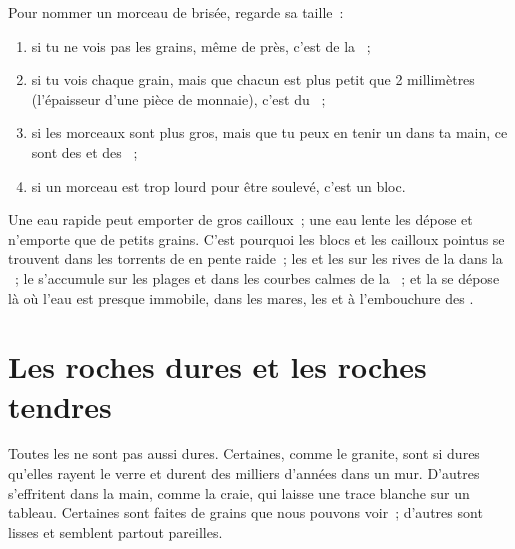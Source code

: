 \begin{method}\label{met:g3:stones-pebbles-sand:sort}
Pour nommer un morceau de  brisée, regarde sa taille~:
\begin{enumerate}
  \item si tu ne vois pas les grains, même de près, c'est de la ~;
  \item si tu vois chaque grain, mais que chacun est plus petit que
        2 millimètres (l'épaisseur d'une pièce de monnaie), c'est du ~;
  \item si les morceaux sont plus gros, mais que tu peux en tenir un dans
        ta main, ce sont des  et des ~;
  \item si un morceau est trop lourd pour être soulevé, c'est un bloc.
\end{enumerate}
\end{method}

\begin{example}\label{ex:g3:stones-pebbles-sand:where}
Une eau rapide peut emporter de gros cailloux~; une eau lente les dépose
et n'emporte que de petits grains. C'est pourquoi les blocs et les
cailloux pointus se trouvent dans les torrents de  en pente
raide~; les  et les  sur les rives de la  dans la
~; le  s'accumule sur les plages et dans les courbes calmes de
la ~; et la  se dépose là où l'eau est presque immobile, dans
les mares, les  et à l'embouchure des .
\end{example}

\section{Les roches dures et les roches tendres}

Toutes les  ne sont pas aussi dures. Certaines, comme le granite,
sont si dures qu'elles rayent le verre et durent des milliers d'années
dans un mur. D'autres s'effritent dans la main, comme la craie, qui laisse
une trace blanche sur un tableau. Certaines  sont faites de grains
que nous pouvons voir~; d'autres sont lisses et semblent partout pareilles.

